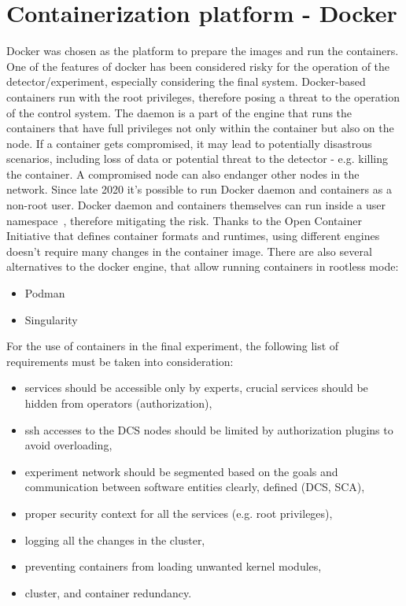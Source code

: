 \section{Containerization platform - Docker}
Docker was chosen as the platform to prepare the images and run the containers. One of the features of docker has been considered risky for the operation of the detector/experiment, especially considering the final system. Docker-based containers run with the root privileges, therefore posing a threat to the operation of the control system. The daemon is a part of the engine that runs the containers that have full privileges not only within the container but also on the node. If a container gets compromised, it may lead to potentially disastrous scenarios, including loss of data or potential threat to the detector - e.g. killing the container. A compromised node can also endanger other nodes in the network.  Since late 2020 it's possible to run Docker daemon and containers as a non-root user. Docker daemon and containers themselves can run inside a user namespace~\cite{docker_limitations}, therefore mitigating the risk.
 Thanks to the Open Container Initiative that defines container formats and runtimes, using different engines doesn't require many changes in the container image. There are also several alternatives to the docker engine, that allow running containers in rootless mode:
\begin{itemize}
    \item Podman~\cite{Podman} 
    \item Singularity~\cite{singularity}
\end{itemize}

For the use of containers in the final experiment, the following list of requirements must be taken into consideration:

\begin{itemize}
    \item services should be accessible only by experts, crucial services should be hidden from operators (authorization),
    \item ssh accesses to the DCS nodes should be limited by authorization plugins to avoid overloading,
    \item experiment network should be segmented based on the goals and communication between software entities clearly, defined (\gls{DCS}, \gls{SCA}),
    \item proper security context for all the services (e.g. root privileges),
    \item logging all the changes in the cluster,
    \item preventing containers from loading unwanted kernel modules,
    \item cluster, and container redundancy.
\end{itemize}


